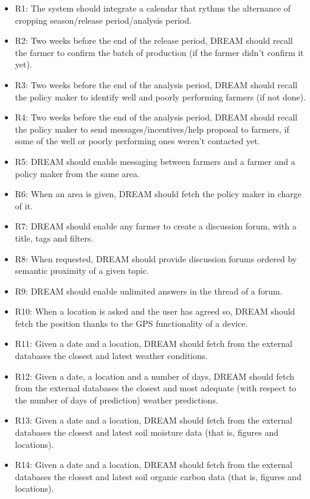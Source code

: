 \begin{itemize}
	\item
	R1: The system should integrate a calendar that rythms the alternance of cropping season/release period/analysis period. 
	\item
	R2: Two weeks before the end of the release period, DREAM should recall the farmer to confirm the batch of production (if the farmer didn't confirm it yet).
	\item
	R3: Two weeks before the end of the analysis period, DREAM should recall the policy maker to identify well and poorly performing farmers (if not done).
	\item
	R4: Two weeks before the end of the analysis period, DREAM should recall the policy maker to send messages/incentives/help proposal to farmers, if some of the well or poorly performing ones weren't contacted yet.
	\item
	R5: DREAM should enable messaging between farmers and a farmer and a policy maker from the same area.
	\item
	R6: When an area is given, DREAM should fetch the policy maker in charge of it.
	\item
	R7: DREAM should enable any farmer to create a discussion forum, with a title, tags and filters.
	\item
	R8: When requested, DREAM should provide discussion forums ordered by semantic proximity of a given topic.
	\item
	R9: DREAM should enable unlimited answers in the thread of a forum.
	\item
	R10: When a location is asked and the user has agreed so, DREAM should fetch the position thanks to the GPS functionality of a device.
	\item
	R11: Given a date and a location, DREAM should fetch from the external databases the  closest and latest weather conditions.
	\item
	R12: Given a date, a location and a number of days, DREAM should fetch from the external databases the  closest and most adequate (with respect to the number of days of prediction) weather predictions.
	\item
	R13: Given a date and a location, DREAM should fetch from the external databases the  closest and latest soil moisture data (that is, figures and locations).
	\item
	R14: Given a date and a location, DREAM should fetch from the external databases the  closest and latest soil organic carbon data (that is, figures and locations).

\end{itemize}
